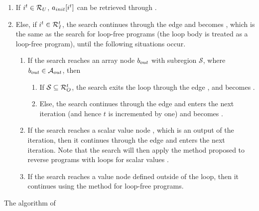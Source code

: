 \begin{algorithm}
\begin{enumerate}

\item If $i^t\in \mathcal{R}_{U}$, $a_{init}[i^t]$ can be retrieved through \EdgeWithSubregion{\AIn}{\Rd}{\AOut}.

\item Else, if  $i^t\in \mathcal{R}^t_{I}$, the search continues  through the edge \EdgeWithSubregion{\AIn}{\Ra}{\AInI} and becomes , which is the same as the search for loop-free programs (the loop body is treated as a loop-free program), until the following situations occur.


\begin{enumerate}

\item If the search reaches an array node $b_{out}$ with subregion $\mathcal{S}$, where $b_{out} \in \mathcal{A}_{out}$, then


\begin{enumerate}

\item If $\mathcal{S}\subseteq \mathcal{R}^t_{O}$, the search exits the loop through the edge ,  and becomes .

\item Else, the search continues through the edge  and enters the next iteration (and hence $t$ is incremented by one) and becomes .

\end{enumerate}

\item If the search reaches a scalar value node , which is an output of the iteration, then it continues through the edge  and enters the next iteration. Note that the search will then apply the method proposed to reverse programs with loops for scalar values \cite{HouRC}.

\item If the search reaches a value node defined outside of the loop, then it continues using the method for loop-free programs.

\end{enumerate}

\end{enumerate}

\caption{The algorithm of   }
\label{algorithm:loop}
\end{algorithm}

